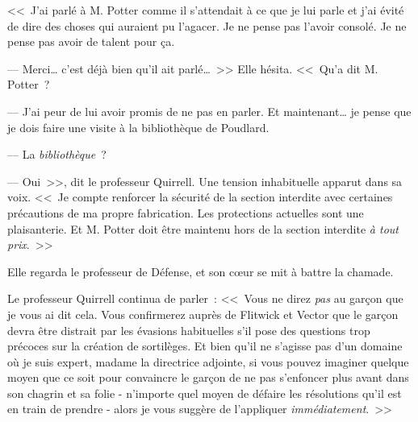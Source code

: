<<~J'ai parlé à M. Potter comme il s'attendait à ce que je lui parle et j'ai évité de dire des choses qui auraient pu l'agacer. Je ne pense pas l'avoir consolé. Je ne pense pas avoir de talent pour ça.

--- Merci… c'est déjà bien qu'il ait parlé…~>> Elle hésita. <<~Qu'a dit M. Potter~?

--- J'ai peur de lui avoir promis de ne pas en parler. Et maintenant… je pense que je dois faire une visite à la bibliothèque de Poudlard.

--- La \emph{bibliothèque}~?

--- Oui~>>, dit le professeur Quirrell. Une tension inhabituelle apparut dans sa voix. <<~Je compte renforcer la sécurité de la section interdite avec certaines précautions de ma propre fabrication. Les protections actuelles sont une plaisanterie. Et M. Potter doit être maintenu hors de la section interdite \emph{à tout prix}.~>>

Elle regarda le professeur de Défense, et son cœur se mit à battre la chamade.

Le professeur Quirrell continua de parler~: <<~Vous ne direz \emph{pas} au garçon que je vous ai dit cela. Vous confirmerez auprès de Flitwick et Vector que le garçon devra être distrait par les évasions habituelles s'il pose des questions trop précoces sur la création de sortilèges. Et bien qu'il ne s'agisse pas d'un domaine où je suis expert, madame la directrice adjointe, si vous pouvez imaginer quelque moyen que ce soit pour convaincre le garçon de ne pas s'enfoncer plus avant dans son chagrin et sa folie - n'importe quel moyen de défaire les résolutions qu'il est en train de prendre - alors je vous suggère de l'appliquer \emph{immédiatement}.~>>
